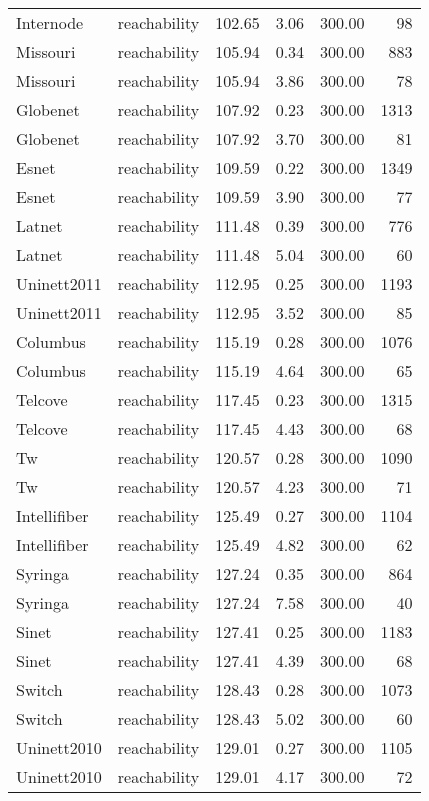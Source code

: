 \begin{tabular}{llrrrr}
Internode & reachability & 102.65 & 3.06 & 300.00 & 98 \\
Missouri & reachability & 105.94 & 0.34 & 300.00 & 883 \\
Missouri & reachability & 105.94 & 3.86 & 300.00 & 78 \\
Globenet & reachability & 107.92 & 0.23 & 300.00 & 1313 \\
Globenet & reachability & 107.92 & 3.70 & 300.00 & 81 \\
Esnet & reachability & 109.59 & 0.22 & 300.00 & 1349 \\
Esnet & reachability & 109.59 & 3.90 & 300.00 & 77 \\
Latnet & reachability & 111.48 & 0.39 & 300.00 & 776 \\
Latnet & reachability & 111.48 & 5.04 & 300.00 & 60 \\
Uninett2011 & reachability & 112.95 & 0.25 & 300.00 & 1193 \\
Uninett2011 & reachability & 112.95 & 3.52 & 300.00 & 85 \\
Columbus & reachability & 115.19 & 0.28 & 300.00 & 1076 \\
Columbus & reachability & 115.19 & 4.64 & 300.00 & 65 \\
Telcove & reachability & 117.45 & 0.23 & 300.00 & 1315 \\
Telcove & reachability & 117.45 & 4.43 & 300.00 & 68 \\
Tw & reachability & 120.57 & 0.28 & 300.00 & 1090 \\
Tw & reachability & 120.57 & 4.23 & 300.00 & 71 \\
Intellifiber & reachability & 125.49 & 0.27 & 300.00 & 1104 \\
Intellifiber & reachability & 125.49 & 4.82 & 300.00 & 62 \\
Syringa & reachability & 127.24 & 0.35 & 300.00 & 864 \\
Syringa & reachability & 127.24 & 7.58 & 300.00 & 40 \\
Sinet & reachability & 127.41 & 0.25 & 300.00 & 1183 \\
Sinet & reachability & 127.41 & 4.39 & 300.00 & 68 \\
Switch & reachability & 128.43 & 0.28 & 300.00 & 1073 \\
Switch & reachability & 128.43 & 5.02 & 300.00 & 60 \\
Uninett2010 & reachability & 129.01 & 0.27 & 300.00 & 1105 \\
Uninett2010 & reachability & 129.01 & 4.17 & 300.00 & 72 \\

\end{tabular}
